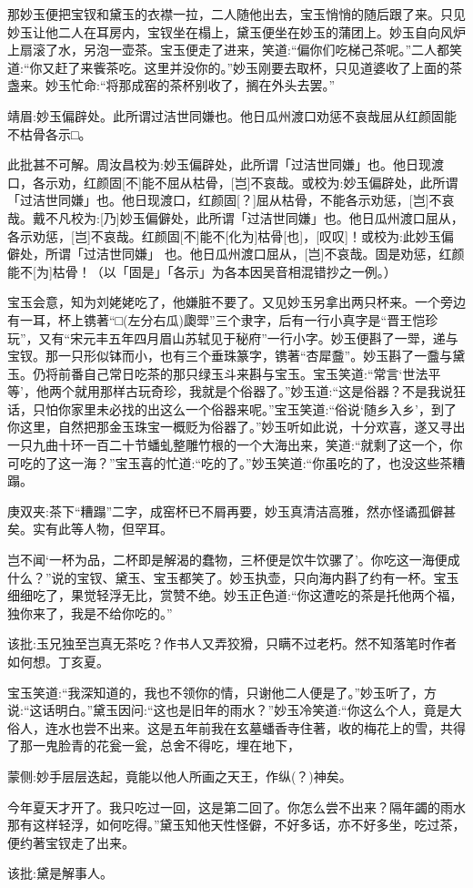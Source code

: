 \begin{parag}
    那妙玉便把宝钗和黛玉的衣襟一拉，二人随他出去，宝玉悄悄的随后跟了来。只见妙玉让他二人在耳房内，宝钗坐在榻上，黛玉便坐在妙玉的蒲团上。妙玉自向风炉上扇滚了水，另泡一壶茶。宝玉便走了进来，笑道:“偏你们吃梯己茶呢。”二人都笑道:“你又赶了来飺茶吃。这里并没你的。”妙玉刚要去取杯，只见道婆收了上面的茶盏来。妙玉忙命:“将那成窑的茶杯别收了，搁在外头去罢。”\begin{note}靖眉:妙玉偏辟处。此所谓过洁世同嫌也。他日瓜州渡口劝惩不哀哉屈从红颜固能不枯骨各示□。\end{note}\begin{subnote}此批甚不可解。周汝昌校为:妙玉偏辟处，此所谓「过洁世同嫌」也。他日现渡口，各示劝，红颜固[不]能不屈从枯骨，[岂]不哀哉。或校为:妙玉偏辟处，此所谓「过洁世同嫌」也。他日现渡口，红颜固[？]屈从枯骨，不能各示劝惩，[岂]不哀哉。戴不凡校为:[乃]妙玉偏僻处，此所谓「过洁世同嫌」也。他日瓜州渡口屈从，各示劝惩，[岂]不哀哉。红颜固[不]能不[化为]枯骨[也]，[叹叹]！或校为:此妙玉偏僻处，所谓「过洁世同嫌」 也。他日瓜州渡口屈从，[岂]不哀哉。固是劝惩，红颜能不[为]枯骨！（以「固是」「各示」为各本因吴音相混错抄之一例。）\end{subnote}宝玉会意，知为刘姥姥吃了，他嫌脏不要了。又见妙玉另拿出两只杯来。一个旁边有一耳，杯上镌著“□(左分右瓜)瓟斝”三个隶字，后有一行小真字是“晋王恺珍玩”，又有“宋元丰五年四月眉山苏轼见于秘府”一行小字。妙玉便斟了一斝，递与宝钗。那一只形似钵而小，也有三个垂珠篆字，镌著“杏犀䀉”。妙玉斟了一䀉与黛玉。仍将前番自己常日吃茶的那只绿玉斗来斟与宝玉。宝玉笑道:“常言‘世法平等’，他两个就用那样古玩奇珍，我就是个俗器了。”妙玉道:“这是俗器？不是我说狂话，只怕你家里未必找的出这么一个俗器来呢。”宝玉笑道:“俗说‘随乡入乡’，到了你这里，自然把那金玉珠宝一概贬为俗器了。”妙玉听如此说，十分欢喜，遂又寻出一只九曲十环一百二十节蟠虬整雕竹根的一个大海出来，笑道:“就剩了这一个，你可吃的了这一海？”宝玉喜的忙道:“吃的了。”妙玉笑道:“你虽吃的了，也没这些茶糟蹋。\begin{note}庚双夹:茶下“糟蹋”二字，成窑杯已不屑再要，妙玉真清洁高雅，然亦怪谲孤僻甚矣。实有此等人物，但罕耳。\end{note}岂不闻‘一杯为品，二杯即是解渴的蠢物，三杯便是饮牛饮骡了’。你吃这一海便成什么？”说的宝钗、黛玉、宝玉都笑了。妙玉执壶，只向海内斟了约有一杯。宝玉细细吃了，果觉轻浮无比，赏赞不绝。妙玉正色道:“你这遭吃的茶是托他两个福，独你来了，我是不给你吃的。”\begin{note}该批:玉兄独至岂真无茶吃？作书人又弄狡猾，只瞒不过老朽。然不知落笔时作者如何想。丁亥夏。\end{note}宝玉笑道:“我深知道的，我也不领你的情，只谢他二人便是了。”妙玉听了，方说:“这话明白。”黛玉因问:“这也是旧年的雨水？”妙玉冷笑道:“你这么个人，竟是大俗人，连水也尝不出来。这是五年前我在玄墓蟠香寺住著，收的梅花上的雪，共得了那一鬼脸青的花瓮一瓮，总舍不得吃，埋在地下，\begin{note}蒙侧:妙手层层迭起，竟能以他人所画之天王，作纵(？)神矣。\end{note}今年夏天才开了。我只吃过一回，这是第二回了。你怎么尝不出来？隔年蠲的雨水那有这样轻浮，如何吃得。”黛玉知他天性怪僻，不好多话，亦不好多坐，吃过茶，便约著宝钗走了出来。\begin{note}该批:黛是解事人。\end{note}
\end{parag}



